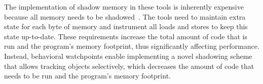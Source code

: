 The implementation of shadow memory in these tools is inherently expensive because all memory needs to be shadowed~\cite{Nethercote:2007:SBM:1254810.1254820}. The tools need to maintain extra state for each byte of memory and instrument all loads and stores to keep this state up-to-date. These requirements increase the total amount of code that is run and the program's memory footprint, thus significantly affecting performance. Instead, behavioral watchpoints enable implementing a novel shadowing scheme that allows tracking objects selectively, which decreases the amount of code that needs to be
run and the program's memory footprint.











